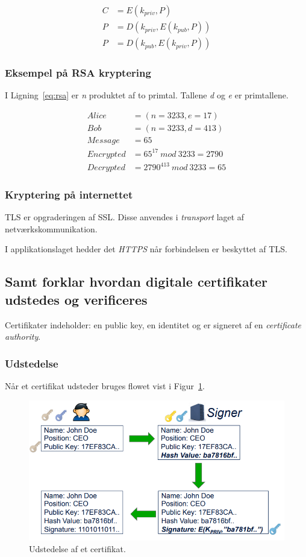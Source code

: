 \begin{align}\label{eq:asym}
	C &= E(k_{priv}, P)\\
	P &= D(k_{priv}, E(k_{pub}, P))\\
	P &= D(k_{pub}, E(k_{priv}, P))
\end{align}

\subsubsection{Eksempel på RSA kryptering}
I Ligning~\ref{eq:rsa} er \textit{n} produktet af to primtal. Tallene \textit{d} og \textit{e} er primtallene.

\begin{align}\label{eq:rsa}
	Alice &= (n = 3233, e = 17)\\
	Bob &= (n = 3233, d = 413)\\
	Message &= 65\\
	Encrypted &= 65^{17}~mod~3233 = 2790\\
	Decrypted &= 2790^{413}~mod~3233 = 65
\end{align}



\subsubsection{Kryptering på internettet}
TLS er opgraderingen af SSL. Disse anvendes i \textit{transport} laget af netværkskommunikation. 

I applikationslaget hedder det \textit{HTTPS} når forbindelsen er beskyttet af TLS.

\subsection{Samt forklar hvordan digitale certifikater udstedes og verificeres}
Certifikater indeholder: en public key, en identitet og er signeret af en \textit{certificate authority}.

\subsubsection{Udstedelse}
Når et certifikat udsteder bruges flowet vist i Figur~\ref{fig:cert-issue}.

\begin{figure}[H]
	\centering
	\includegraphics[width=0.8\linewidth]{figs/spm4/cert-issue}
	\caption{Udstedelse af et certifikat.}
	\label{fig:cert-issue}
\end{figure}


